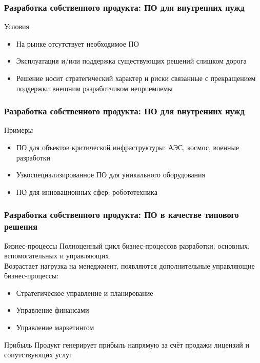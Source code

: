 \documentclass{../industrial-development}
\begin{document}
\begin{frame} \frametitle{Разработка собственного продукта: ПО для внутренних нужд}
	\begin{block}{Условия}
		\begin{itemize}
			\item На рынке отсутствует необходимое ПО
			\item Эксплуатация и/или поддержка существующих решений слишком дорога
			\item Решение носит стратегический характер и риски связанные с прекращением поддержки внешним разработчиком неприемлемы
		\end{itemize}
	\end{block}
\end{frame}
\lecturenotes


\begin{frame} \frametitle{Разработка собственного продукта: ПО для внутренних нужд}
	\begin{block}{Примеры}
		\begin{itemize}
			\item ПО для объектов критической инфраструктуры: АЭС, космос, военные разработки
			\item Узкоспециализированное ПО для уникального оборудования
			\item ПО для инновационных сфер: робототехника
		\end{itemize}
	\end{block}
\end{frame}
\lecturenotes


\begin{frame} \frametitle{Разработка собственного продукта: ПО в качестве типового решения}
	\begin{block}{Бизнес-процессы}
		Полноценный цикл бизнес-процессов разработки: основных, вспомогательных и управляющих.\\
		Возрастает нагрузка на менеджмент, появляются дополнительные управляющие бизнес-процессы:
		\begin{itemize}
			\item Стратегическое управление и планирование
			\item Управление финансами
			\item Управление маркетингом
		\end{itemize}
	\end{block}
	\begin{block}{Прибыль}
		Продукт генерирует прибыль напрямую за счёт продажи лицензий и сопутствующих услуг
	\end{block}
\end{frame}
\lecturenotes
\end{document}
